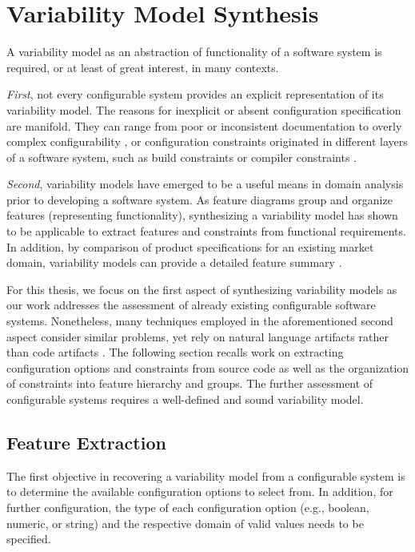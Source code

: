 
\section{Variability Model Synthesis}  \label{sec:feature_model_synthesis}
A variability model as an abstraction of functionality of a software system is
required, or at least of great interest, in many contexts. 

\emph{First}, not
every configurable system provides an explicit
representation of its variability model. 
The reasons for inexplicit or absent configuration specification are manifold.
They can range from poor or inconsistent documentation
\citep{rabkin_static_2011} to overly complex configurability
\citep{xu_hey_2015}, or configuration constraints originated in different layers of a software
system, such as build constraints  or compiler constraints
\citep{nadi_where_2015}.

\emph{Second}, variability models have emerged to be a useful means in domain
analysis prior to developing a software system. As feature diagrams group and
organize features (representing functionality), synthesizing a variability model
has shown to be applicable to extract features and constraints from functional requirements.
In addition, by comparison of product specifications for an
existing market domain, variability models can provide a detailed feature
summary \citep{alves_exploratory_2008,bakar_feature_2015}.

For this thesis, we focus on the first aspect of synthesizing variability
models as our work addresses the assessment of already existing configurable
software systems. Nonetheless, many techniques employed in the aforementioned
second aspect consider similar problems, yet rely on natural language artifacts
rather than code artifacts \citep{alves_exploratory_2008,bakar_feature_2015}.
The following section recalls work on extracting configuration options and
constraints from source code as well as the organization of constraints into
feature hierarchy and groups. The further assessment of configurable systems
requires a well-defined and sound variability model.

\subsection{Feature Extraction} 
The first objective in recovering a variability model from a configurable
system is to determine the available configuration options to select
from. In addition, for further configuration, the type of each configuration
option (e.g., boolean, numeric, or string) and the respective domain of valid
values needs to be specified.

